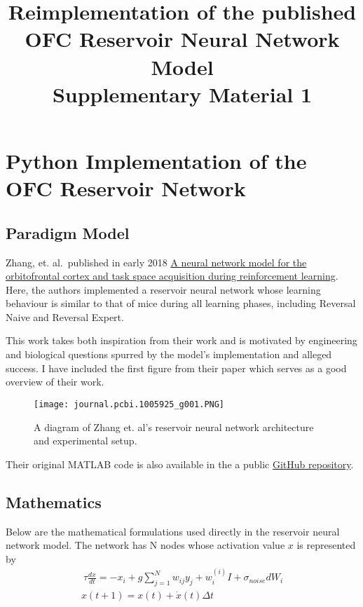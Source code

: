 \documentclass[11pt]{article}
\title{Reimplementation of the published OFC Reservoir Neural Network Model \\
    	Supplementary Material 1}
\makeatletter
\def\maxwidth{\ifdim\Gin@nat@width>\linewidth\linewidth
    \else\Gin@nat@width\fi}
\let\Oldincludegraphics\includegraphics
\renewcommand{\includegraphics}[1]{\Oldincludegraphics[width=.8\maxwidth]{#1}}
\makeatother
\begin{document}
    
    
    \maketitle
    
    

    
    \hypertarget{python-implementation-of-the-ofc-reservoir-network}{%
\section{Python Implementation of the OFC Reservoir
Network}\label{python-implementation-of-the-ofc-reservoir-network}}

\hypertarget{paradigm-model}{%
\subsection{Paradigm Model}\label{paradigm-model}}

Zhang, et. al.~published in early 2018
\href{https://journals.plos.org/ploscompbiol/article/file?id=10.1371/journal.pcbi.1005925\&type=printable}{A
neural network model for the orbitofrontal cortex and task space
acquisition during reinforcement learning}. Here, the authors
implemented a reservoir neural network whose learning behaviour is
similar to that of mice during all learning phases, including Reversal
Naive and Reversal Expert.

This work takes both inspiration from their work and is motivated by
engineering and biological questions spurred by the model's
implementation and alleged success. I have included the first figure
from their paper which serves as a good overview of their work.

\begin{figure}
\centering
\texttt{[image: journal.pcbi.1005925\_g001.PNG]}
\caption{A diagram of Zhang et. al's reservoir neural network architecture and experimental setup.}
\end{figure}

Their original MATLAB code is also available in the a public
\href{https://github.com/tyangLab/ReservoirNet_OFC_TaskState}{GitHub
repository}.

\hypertarget{mathematics}{%
\subsection{Mathematics}\label{mathematics}}

Below are the mathematical formulations used directly in the reservoir
neural network model. The network has N nodes whose activation value
\(x\) is represented by \begin{align}
\ \tau\frac{dx}{dt}= -x_i + g \sum_{j=1}^N w_{ij} y_j + w_i^{(i)}I + \sigma_{noise}dW_i \\
x(t + 1) = x(t) + \dot{x}(t)\Delta t
\end{align}
\end{document}
